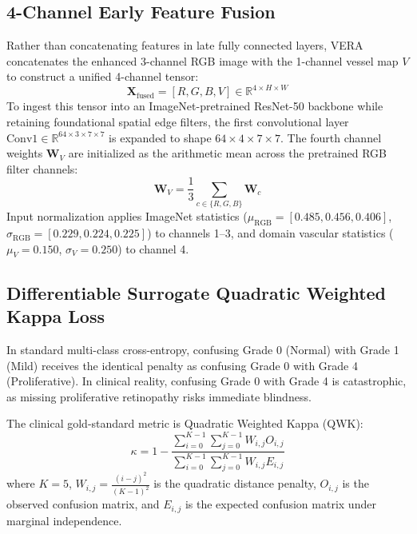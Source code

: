 \documentclass[conference]{IEEEtran}
\begin{document}
\subsection{4-Channel Early Feature Fusion}
Rather than concatenating features in late fully connected layers, VERA concatenates the enhanced 3-channel RGB image with the 1-channel vessel map $V$ to construct a unified 4-channel tensor:
\begin{equation}
    \mathbf{X}_{\text{fused}} = [R, G, B, V] \in \mathbb{R}^{4 \times H \times W}
\end{equation}
To ingest this tensor into an ImageNet-pretrained ResNet-50 backbone while retaining foundational spatial edge filters, the first convolutional layer $\text{Conv1} \in \mathbb{R}^{64 \times 3 \times 7 \times 7}$ is expanded to shape $64 \times 4 \times 7 \times 7$. The fourth channel weights $\mathbf{W}_V$ are initialized as the arithmetic mean across the pretrained RGB filter channels:
\begin{equation}
    \mathbf{W}_V = \frac{1}{3} \sum_{c \in \{R, G, B\}} \mathbf{W}_c
\end{equation}
Input normalization applies ImageNet statistics ($\mu_{\text{RGB}} = [0.485, 0.456, 0.406]$, $\sigma_{\text{RGB}} = [0.229, 0.224, 0.225]$) to channels 1--3, and domain vascular statistics ($\mu_V = 0.150$, $\sigma_V = 0.250$) to channel 4.

\subsection{Differentiable Surrogate Quadratic Weighted Kappa Loss}
In standard multi-class cross-entropy, confusing Grade 0 (Normal) with Grade 1 (Mild) receives the identical penalty as confusing Grade 0 with Grade 4 (Proliferative). In clinical reality, confusing Grade 0 with Grade 4 is catastrophic, as missing proliferative retinopathy risks immediate blindness.

The clinical gold-standard metric is Quadratic Weighted Kappa (QWK):
\begin{equation}
    \kappa = 1 - \frac{\sum_{i=0}^{K-1} \sum_{j=0}^{K-1} W_{i, j} O_{i, j}}{\sum_{i=0}^{K-1} \sum_{j=0}^{K-1} W_{i, j} E_{i, j}}
\end{equation}
where $K=5$, $W_{i, j} = \frac{(i - j)^2}{(K - 1)^2}$ is the quadratic distance penalty, $O_{i, j}$ is the observed confusion matrix, and $E_{i, j}$ is the expected confusion matrix under marginal independence.
\end{document}
